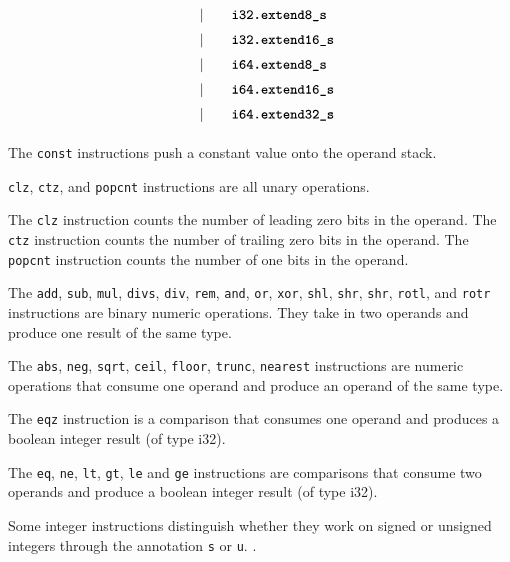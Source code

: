 \begin{alignat*}{9}
    &&       &&\quad | &\quad && \textbf{\texttt{i32.extend8\textunderscore s}} \quad &&  \\[1mm]
    &&       &&\quad | &\quad && \textbf{\texttt{i32.extend16\textunderscore s}} \quad &&  \\[1mm]
    &&       &&\quad | &\quad && \textbf{\texttt{i64.extend8\textunderscore s}} \quad &&  \\[1mm]
    &&       &&\quad | &\quad && \textbf{\texttt{i64.extend16\textunderscore s}} \quad &&  \\[1mm]
    &&       &&\quad | &\quad && \textbf{\texttt{i64.extend32\textunderscore s}} \quad &&  \\[1mm]
\end{alignat*}


The \texttt{const} instructions push a constant value onto the operand stack. \vspace{1em}

\texttt{clz}, \texttt{ctz}, and \texttt{popcnt} instructions are all unary operations. \vspace{1em}

The \texttt{clz} instruction counts the number of leading zero bits in the operand.
The \texttt{ctz} instruction counts the number of trailing zero bits in the operand.
The \texttt{popcnt} instruction counts the number of one bits in the operand. \vspace{1em}

The \texttt{add}, \texttt{sub}, \texttt{mul}, \texttt{div\textunderscore s}, \texttt{div}, \texttt{rem}, \texttt{and}, \texttt{or}, \texttt{xor}, \texttt{shl}, \texttt{shr}, \texttt{shr}, \texttt{rotl}, and \texttt{rotr} instructions are binary numeric operations. They take in two operands and produce one result of the same type.\vspace{1em}

The \texttt{abs}, \texttt{neg}, \texttt{sqrt}, \texttt{ceil}, \texttt{floor}, \texttt{trunc}, \texttt{nearest} instructions are numeric operations that consume one operand and produce an operand of the same type.

The \texttt{eqz} instruction is a comparison that consumes one operand and produces a boolean integer result (of type i32). \vspace{1em}

The \texttt{eq}, \texttt{ne}, \texttt{lt}, \texttt{gt}, \texttt{le} and \texttt{ge} instructions are comparisons that consume two operands and produce a boolean integer result (of type i32). \vspace{1em}

Some integer instructions distinguish whether they work on signed or unsigned integers through the annotation \texttt{\textunderscore s} or \texttt{\textunderscore u}. \vspace{1em}. \vspace{1em}